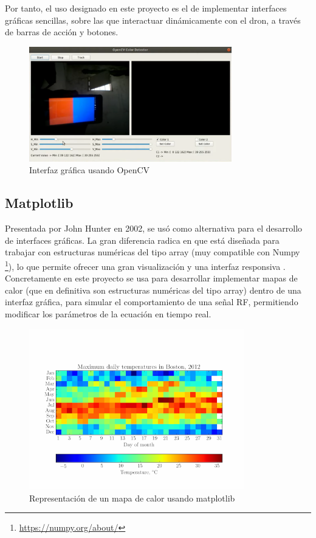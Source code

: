 Por tanto, el uso designado en este proyecto es el de implementar interfaces gráficas sencillas, sobre las que interactuar dinámicamente con el dron, a través de barras de acción y botones.

\begin{figure} [H]
	\begin{center}
	\includegraphics[height=5cm]{imagenes/cap3/5_opencv_example.png}
	\end{center}
	\caption[Interfaz gráfica usando OpenCV]{Interfaz gráfica usando OpenCV}
	\label{fig:opencv}
\end{figure}

\subsection{Matplotlib}
\label{subsec:matplotlib}

Presentada por John Hunter en 2002, se usó como alternativa para el desarrollo de interfaces gráficas. La gran diferencia radica en que está diseñada para trabajar con estructuras numéricas del tipo array (muy compatible con Numpy \footnote{\url{https://numpy.org/about/}}), lo que permite ofrecer una gran visualización y una interfaz responsiva \cite{matplotlib-def}.\\

Concretamente en este proyecto se usa para desarrollar implementar mapas de calor (que en definitiva son estructuras numéricas del tipo array) dentro de una interfaz gráfica, para simular el comportamiento de una señal \ac{RF}, permitiendo modificar los parámetros de la ecuación en tiempo real.

\begin{figure} [H]
	\begin{center}
	\includegraphics[height=7cm]{imagenes/cap3/6_matplotlib_app.png}
	\end{center}
	\caption[Representación de un mapa de calor usando matplotlib]{Representación de un mapa de calor usando matplotlib}
	\label{fig:matplotlib}
\end{figure}


